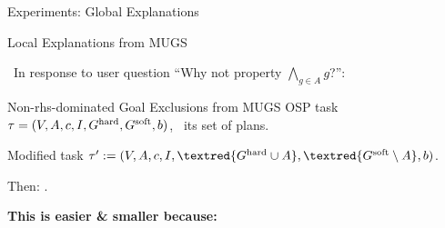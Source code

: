 \begin{frame}{Experiments: Global Explanations}

\centering

\setlength{\tabcolsep}{2pt}
\renewcommand{\arraystretch}{0.8}

\tiny

 

\end{frame}


\begin{frame}{Local Explanations from MUGS}

\notesym~In response to user question ``Why not property $\bigwedge_{g \in A} g$?'':

\begin{myprop}{Non-rhs-dominated Goal Exclusions from MUGS}
%
OSP task $\tau =
(V,\allowbreak A,\allowbreak{\ensuremath{c}},\allowbreak I,\allowbreak G^{\text{\textup{hard}}},\allowbreak G^{\text{\textup{soft}}},\allowbreak{\ensuremath{b}})$, \plans\
its set of plans.

Modified task $\task' :=
(\vars,\allowbreak\acts,\allowbreak\cost,\allowbreak\init,\allowbreak\textred{\goalhard
\cup A},\allowbreak\textred{\goalsoft \setminus
A},\allowbreak\costbound)$.

Then: .
%
\end{myprop}

\bigskip \smallskip \pause

%
\textbf{This is easier \& smaller because:} \pause \prehandout{\bigskip\bigskip\bigskip\bigskip} 

\medskip

\end{frame}


